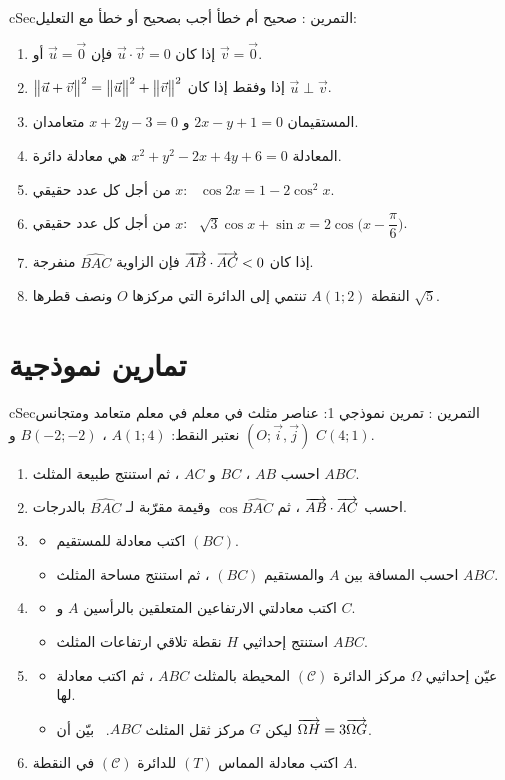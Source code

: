 \documentclass[12pt,a4paper]{article}
\newenvironment{BOX}[2]{\begin{otherlanguage}{english}\begin{arbox}{#1}{#2}}{\end{arbox}\end{otherlanguage}}
\newcounter{exo}
\newenvironment{tamrin}[1]{\stepcounter{exo}\begin{BOX}{cSec}{التمرين \theexo: #1}}{\end{BOX}}
\newenvironment{sq}{\begin{itemize}[leftmargin=2.4em,itemsep=3pt]}{\end{itemize}}
\newcommand{\qa}{\item[(أ)]}\newcommand{\qb}{\item[(ب)]}\newcommand{\qc}{\item[(جـ)]}\newcommand{\qd}{\item[(د)]}\newcommand{\qe}{\item[(هـ)]}
\begin{document}
\begin{tamrin}{صحيح أم خطأ}
أجب بصحيح أو خطأ مع التعليل:
\begin{enumerate}
\item إذا كان $\vec u\cdot\vec v=0$ فإن $\vec u=\vec0$ أو $\vec v=\vec0$.
\item $\big\|\vec u+\vec v\big\|^2=\big\|\vec u\big\|^2+\big\|\vec v\big\|^2$ إذا وفقط إذا كان $\vec u\perp\vec v$.
\item المستقيمان $2x-y+1=0$ و $x+2y-3=0$ متعامدان.
\item المعادلة $x^2+y^2-2x+4y+6=0$ هي معادلة دائرة.
\item من أجل كل عدد حقيقي $x$: \ $\cos2x=1-2\cos^2x$.
\item من أجل كل عدد حقيقي $x$: \ $\sqrt3\cos x+\sin x=2\cos\Big(x-\dfrac\pi6\Big)$.
\item إذا كان $\overrightarrow{AB}\cdot\overrightarrow{AC}<0$ فإن الزاوية $\widehat{BAC}$ منفرجة.
\item النقطة $A(1;2)$ تنتمي إلى الدائرة التي مركزها $O$ ونصف قطرها $\sqrt5$.
\end{enumerate}
\end{tamrin}

\section{تمارين نموذجية}
\begin{tamrin}{تمرين نموذجي 1: عناصر مثلث في معلم}
في معلم متعامد ومتجانس $(O;\vec i,\vec j)$ نعتبر النقط: $A(1;4)$ ، $B(-2;-2)$ و $C(4;1)$.
\begin{enumerate}
\item احسب $AB$ ، $BC$ و $AC$ ، ثم استنتج طبيعة المثلث $ABC$.
\item احسب $\overrightarrow{AB}\cdot\overrightarrow{AC}$ ، ثم $\cos\widehat{BAC}$ وقيمة مقرّبة لـ $\widehat{BAC}$ بالدرجات.
\item
\begin{sq}
\qa اكتب معادلة للمستقيم $(BC)$.
\qb احسب المسافة بين $A$ والمستقيم $(BC)$ ، ثم استنتج مساحة المثلث $ABC$.
\end{sq}
\item
\begin{sq}
\qa اكتب معادلتي الارتفاعين المتعلقين بالرأسين $A$ و $C$.
\qb استنتج إحداثيي $H$ نقطة تلاقي ارتفاعات المثلث $ABC$.
\end{sq}
\item
\begin{sq}
\qa عيّن إحداثيي $\Omega$ مركز الدائرة $(\mathcal C)$ المحيطة بالمثلث $ABC$ ، ثم اكتب معادلة لها.
\qb ليكن $G$ مركز ثقل المثلث $ABC$. \ بيّن أن $\overrightarrow{\Omega H}=3\overrightarrow{\Omega G}$.
\end{sq}
\item اكتب معادلة المماس $(T)$ للدائرة $(\mathcal C)$ في النقطة $A$.
\end{enumerate}
\end{tamrin}
\end{document}
